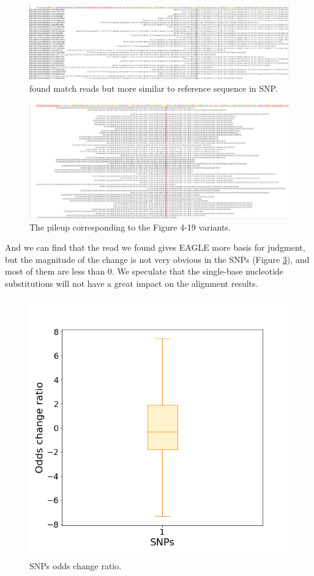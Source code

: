 \begin{figure}[H]
\centering
\includegraphics[width=1\columnwidth]{body/image/snp_new_REFread.png}
\caption[SNP worse match reads]{ found match reads but more similar to reference sequence in SNP.}
\label{snp_new_REFread}
\end{figure}

\begin{figure}[H]
\centering
\includegraphics[width=1\columnwidth]{body/image/snp_pileup_REFread.png}
\caption[SNP worse match reads pileup]{The pileup corresponding to the Figure 4-19 variants.}
\label{snp_pileup_REFread}
\end{figure}

And we can find that the read we found gives EAGLE more basis for judgment, but the magnitude of the change is not very obvious in the SNPs (Figure \ref{snp_odds_change}), and most of them are less than 0. We speculate that the single-base nucleotide substitutions will not have a great impact on the alignment results.

\begin{figure}[H]
\centering
\includegraphics[width=0.6\columnwidth]{body/image/snp_odds_change.png}
\caption[SNPs odds change ratio]{SNPs odds change ratio.}
\label{snp_odds_change}
\end{figure}


